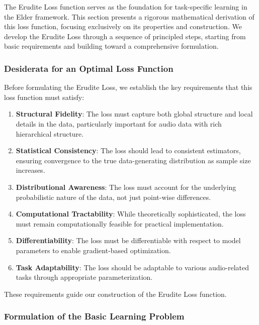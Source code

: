 The Erudite Loss function serves as the foundation for task-specific learning in the Elder framework. This section presents a rigorous mathematical derivation of this loss function, focusing exclusively on its properties and construction. We develop the Erudite Loss through a sequence of principled steps, starting from basic requirements and building toward a comprehensive formulation.

\subsubsection{Desiderata for an Optimal Loss Function}

Before formulating the Erudite Loss, we establish the key requirements that this loss function must satisfy:

\begin{enumerate}
\item \textbf{Structural Fidelity}: The loss must capture both global structure and local details in the data, particularly important for audio data with rich hierarchical structure.

\item \textbf{Statistical Consistency}: The loss should lead to consistent estimators, ensuring convergence to the true data-generating distribution as sample size increases.

\item \textbf{Distributional Awareness}: The loss must account for the underlying probabilistic nature of the data, not just point-wise differences.

\item \textbf{Computational Tractability}: While theoretically sophisticated, the loss must remain computationally feasible for practical implementation.

\item \textbf{Differentiability}: The loss must be differentiable with respect to model parameters to enable gradient-based optimization.

\item \textbf{Task Adaptability}: The loss should be adaptable to various audio-related tasks through appropriate parameterization.
\end{enumerate}

These requirements guide our construction of the Erudite Loss function.

\subsubsection{Formulation of the Basic Learning Problem}

